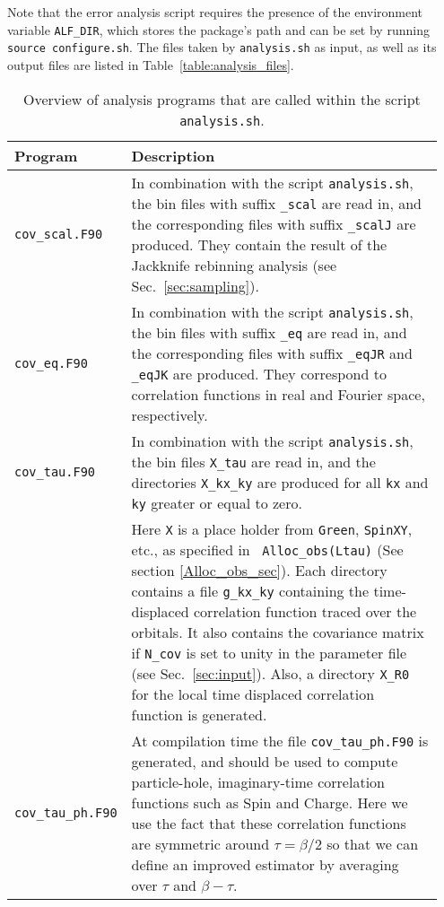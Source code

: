 Note that the error analysis script requires the presence of the environment variable \texttt{ALF\_DIR}, which stores the package's path and can be set by running \texttt{source configure.sh}. The files taken by \texttt{analysis.sh} as input, as well as its output files are listed in Table~\ref{table:analysis_files}.

\begin{table}[h]
	\begin{center}
	\begin{tabular}{@{} p{0.15\linewidth} p{0.8\linewidth} @{}}\toprule
		Program & Description \\\midrule
		\texttt{cov\_scal.F90}  &  In combination with the script \texttt{analysis.sh}, the bin files with suffix \texttt{\_scal} are read in, and  the corresponding files with suffix \texttt{\_scalJ} are produced. They  contain the  result of the Jackknife rebinning analysis  (see Sec.~\ref{sec:sampling}).  \\
		\texttt{cov\_eq.F90}    &  In combination with the script \texttt{analysis.sh}, the bin files with suffix \texttt{\_eq} are read in, and the corresponding files with suffix  \texttt{\_eqJR}  and  \texttt{\_eqJK}  are produced. They  correspond to correlation functions in real and Fourier space, respectively.  \\
		\texttt{cov\_tau.F90}   &  In combination with the script \texttt{analysis.sh}, the bin files  \texttt{X\_tau} are read in, and the directories  \texttt{X\_kx\_ky} are produced  for all \texttt{kx} and \texttt{ky} greater or equal to zero. \\
		& Here \texttt{X}  is a place holder from \texttt{Green}, \texttt{SpinXY}, etc., as specified in \texttt{ Alloc\_obs(Ltau)} (See section \ref{Alloc_obs_sec}). Each directory contains  a  file    \texttt{g\_kx\_ky}  containing the  time-displaced correlation function traced over the  orbitals.  It also contains the covariance matrix if \texttt{N\_cov} is set to unity in the parameter file  (see Sec.~\ref{sec:input}). Also, a directory  \texttt{X\_R0}  for the local  time displaced  correlation function is generated.  \\                         
		\texttt{cov\_tau\_ph.F90} & At compilation time  the file \texttt{cov\_tau\_ph.F90} is generated, and  should be used to compute particle-hole, imaginary-time correlation functions such as Spin and Charge. Here we use the fact that these  correlation functions  are symmetric around $\tau = \beta/2$ so that we can define an improved estimator by averaging over $\tau$ and $\beta - \tau$.  
		\\\bottomrule
	\end{tabular}
	\caption{ Overview of analysis programs that are called within the script \texttt{analysis.sh}. \label{table:analysis_programs}}
\end{center}
\end{table}
